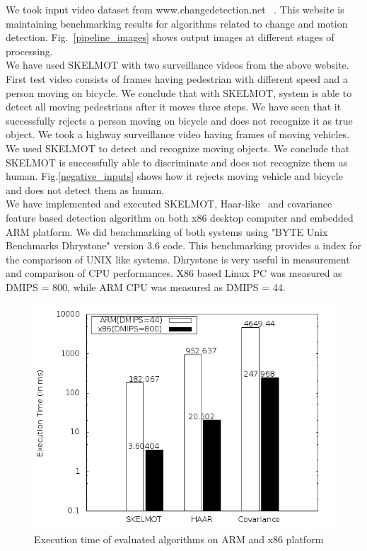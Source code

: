 \indent We took input video dataset from www.changedetection.net
~\cite{36}. This website is maintaining benchmarking results for
algorithms related to change and motion detection. Fig.~\ref{pipeline_images} shows
output images at different stages of processing.\\
\indent We have used SKELMOT with two surveillance videos from the above
website. First test video consists of frames having pedestrian with
different speed and a person moving on bicycle. We conclude that with
SKELMOT, system is able to detect all moving pedestrians after it moves three
steps. We have seen that it successfully rejects a person moving on
bicycle and does not recognize it as true object. We took a highway
surveillance video having frames of moving vehicles. We used SKELMOT to
detect and recognize moving objects. We conclude that SKELMOT is
successfully able to discriminate and does not recognize them as human.
Fig.\ref{negative_inputs} shows how it rejects moving vehicle and
bicycle and does not detect them as human.\\
\indent We have implemented and executed SKELMOT, Haar-like~\cite{19} and
covariance~\cite{19} feature based detection algorithm on both x86
desktop computer and embedded ARM platform. We did benchmarking of both
systems using "BYTE Unix Benchmarks Dhrystone" version 3.6 code. This benchmarking
provides a index for the comparison of UNIX like systems. Dhrystone is
very useful in measurement and comparison of CPU performances. X86 based
Linux PC was measured as DMIPS = 800, while ARM CPU was measured as
DMIPS = 44.\\
\begin{figure}[!b]
\centering
\includegraphics[scale=0.60]{Figures/pipeline_execution_time}
\caption{Execution time of evaluated algorithms on ARM and x86
platform}
\label{pipeline_execution_time}
\end{figure}
